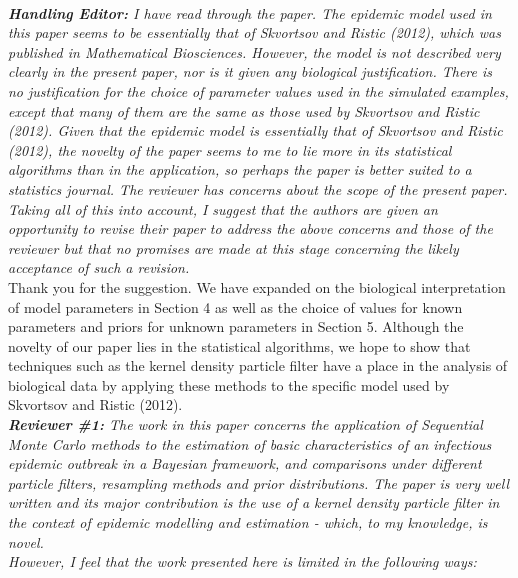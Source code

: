 \documentclass{article}
\begin{document}
 \\

\noindent \emph{{\bf Handling Editor:}  I have read through the paper.  The epidemic model used in this paper seems to be essentially that of Skvortsov and Ristic (2012), which was published in Mathematical Biosciences.  However, the model is not described very clearly in the present paper, nor is it given any biological justification.  There is no justification for the choice of parameter values used in the simulated examples, except that many of them are the same as those used by Skvortsov and Ristic (2012).  Given that the epidemic model is essentially that of Skvortsov and Ristic (2012), the novelty of the paper seems to me to lie more in its statistical algorithms than in the application, so perhaps the paper is better suited to a statistics journal.  The reviewer has concerns about the scope of the present paper.  Taking all of this into account, I suggest that the authors are given an opportunity to revise their paper to address the above concerns and those of the reviewer but that no promises are made at this stage concerning the likely acceptance of such a revision.} \\

Thank you for the suggestion. We have expanded on the biological interpretation of model parameters in Section 4 as well as the choice of values for known parameters and priors for unknown parameters in Section 5. Although the novelty of our paper lies in the statistical algorithms, we hope to show that techniques such as the kernel density particle filter have a place in the analysis of biological data by applying these methods to the specific model used by Skvortsov and Ristic (2012). \\

\noindent \emph{{\bf Reviewer \#1:} The work in this paper concerns the application of Sequential Monte Carlo methods to the estimation of basic characteristics of an infectious epidemic outbreak in a Bayesian framework, and comparisons under different particle filters, resampling methods and prior distributions. The paper is very well written and its major contribution is the use of a kernel density particle filter in the context of epidemic modelling and estimation - which, to my knowledge, is novel.} \\

\noindent \emph{However, I feel that the work presented here is limited in the following ways:} \\
\end{document}
